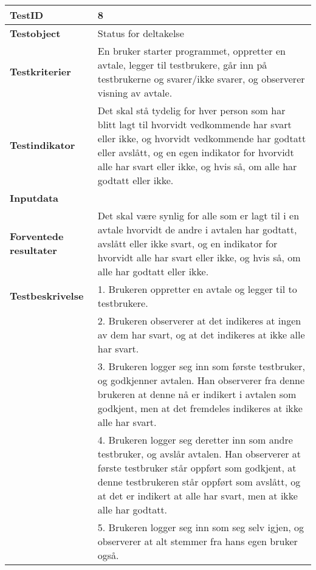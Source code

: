 \mbox{}\\

	\begin{tabularx}{1.2\textwidth}{| p{5cm} | X |}
	\hline
	\textbf{TestID} 																& 8																	\\ \hline
	\textbf{Testobject} 															& Status for deltakelse															\\ \hline
	\textbf{Testkriterier} 															& En bruker starter programmet, oppretter en avtale, legger til testbrukere, går inn på testbrukerne og svarer/ikke svarer, og observerer visning av avtale.						\\ \hline
	\textbf{Testindikator} 															& Det skal stå tydelig for hver person som har blitt lagt til hvorvidt vedkommende har svart eller ikke, og hvorvidt vedkommende har godtatt eller avslått, og en egen indikator for hvorvidt alle har svart eller ikke, og hvis så, om alle har godtatt eller ikke.													\\ \hline
	\textbf{Inputdata} 															& 														\\  \hline
	\textbf{Forventede resultater}									 				& Det skal være synlig for alle som er lagt til i en avtale hvorvidt de andre i avtalen har godtatt, avslått eller ikke svart, og en indikator for hvorvidt alle har svart eller ikke, og hvis så, om alle har godtatt eller ikke.				\\ \hline
	\textbf{Testbeskrivelse} 														& 1. Brukeren oppretter en avtale og legger til to testbrukere. \\
																			& 2. Brukeren observerer at det indikeres at ingen av dem har svart, og at det indikeres at ikke alle har svart.\\
																			& 3. Brukeren logger seg inn som første testbruker, og godkjenner avtalen. Han observerer fra denne brukeren at denne nå er indikert i avtalen som godkjent, men at det fremdeles indikeres at ikke alle har svart.\\
																			& 4. Brukeren logger seg deretter inn som andre testbruker, og avslår avtalen. Han observerer at første testbruker står oppført som godkjent, at denne testbrukeren står oppført som avslått, og at det er indikert at alle har svart, men at ikke alle har godtatt.\\
																			& 5. Brukeren logger seg inn som seg selv igjen, og observerer at alt stemmer fra hans egen bruker også.\\

\end{tabularx}
